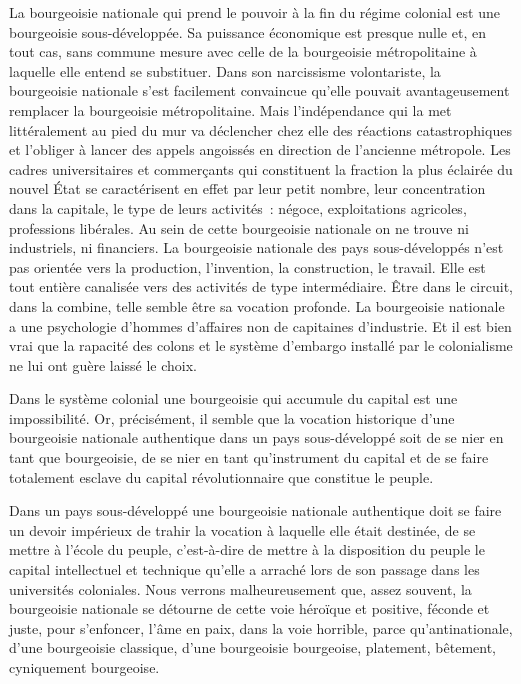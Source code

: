 \documentclass[french,twoside]{book} %
\begin{document}
\noindent La bourgeoisie nationale qui prend le pouvoir à la fin du régime colonial est une bourgeoisie sous-développée. Sa puissance économique est presque nulle et, en tout cas, sans commune mesure avec celle de la bourgeoisie métropolitaine à laquelle elle entend se substituer. Dans son narcissisme volontariste, la bourgeoisie nationale s’est facilement convaincue qu’elle pouvait avantageusement remplacer la bourgeoisie métropolitaine. Mais l’indépendance qui la met littéralement au pied du mur va déclencher chez elle des réactions catastrophiques et l’obliger à lancer des appels angoissés en direction de l’ancienne métropole. Les cadres universitaires et commerçants qui constituent la fraction la plus éclairée du nouvel État se caractérisent en effet par leur petit nombre, leur concentration dans la capitale, le type de leurs activités : négoce, exploitations agricoles, professions libérales. Au sein de cette bourgeoisie nationale on ne trouve ni industriels, ni financiers. La bourgeoisie nationale des pays sous-développés n’est pas orientée vers la production, l’invention, la construction, le travail. Elle est tout entière canalisée vers des activités de type intermédiaire. Être dans le circuit, dans la combine, telle semble être sa vocation profonde. La bourgeoisie nationale a une psychologie d’hommes d’affaires non de capitaines d’industrie. Et il est bien vrai que la rapacité des colons et le système d’embargo installé par le colonialisme ne lui ont guère laissé le choix.\par
Dans le système colonial une bourgeoisie qui accumule du capital est une impossibilité. Or, précisément, il semble que la vocation historique d’une bourgeoisie nationale authentique dans un pays sous-développé soit de se nier en tant que bourgeoisie, de se nier en tant qu’instrument du capital et de se faire totalement esclave du capital révolutionnaire que constitue le peuple.\par
 Dans un pays sous-développé une bourgeoisie nationale authentique doit se faire un devoir impérieux de trahir la vocation à laquelle elle était destinée, de se mettre à l’école du peuple, c’est-à-dire de mettre à la disposition du peuple le capital intellectuel et technique qu’elle a arraché lors de son passage dans les universités coloniales. Nous verrons malheureusement que, assez souvent, la bourgeoisie nationale se détourne de cette voie héroïque et positive, féconde et juste, pour s’enfoncer, l’âme en paix, dans la voie horrible, parce qu’antinationale, d’une bourgeoisie classique, d’une bourgeoisie bourgeoise, platement, bêtement, cyniquement bourgeoise.\par
\end{document}
